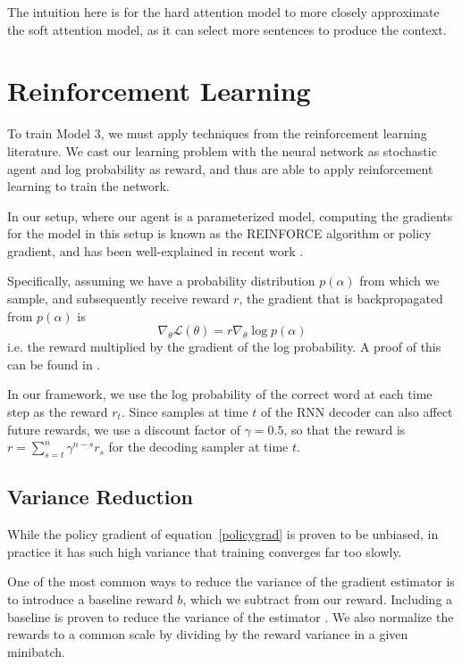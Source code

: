 \documentclass[11pt]{article}
\begin{document}
The intuition here is for the hard attention model to more closely approximate the soft attention model, as it can select more sentences to produce the context.

\section{Reinforcement Learning}

To train Model 3, we must apply techniques from the reinforcement learning literature. We cast our learning problem with the neural network as stochastic agent and log probability as reward, and thus are able to apply reinforcement learning to train the network.

In our setup, where our agent is a parameterized model, computing the gradients for the model in this setup is known as the REINFORCE algorithm \citep{williams1992reinforce} or policy gradient, and has been well-explained in recent work \citep{mnih2014visualattention, ba2015visualattention, schulman2015backprop}.

Specifically, assuming we have a probability distribution $p(\alpha)$ from which we sample, and subsequently receive reward $r$, the gradient that is backpropagated from $p(\alpha)$ is
\begin{equation}
\label{policygrad}
\nabla_\theta \mathcal{L}(\theta) = r \nabla_\theta \log p(\alpha)
\end{equation}
i.e. the reward multiplied by the gradient of the log probability. A proof of this can be found in \cite{williams1992reinforce}.

In our framework, we use the log probability of the correct word at each time step as the reward $r_t$. Since samples at time $t$ of the RNN decoder can also affect future rewards, we use a discount factor of $\gamma = 0.5$, so that the reward is $r = \sum_{s = t}^n \gamma^{n-s}r_s$ for the decoding sampler at time $t$.

\subsection{Variance Reduction}

While the policy gradient of equation~\ref{policygrad} is proven to be unbiased, in practice it has such high variance that training converges far too slowly.

One of the most common ways to reduce the variance of the gradient estimator is to introduce a baseline reward $b$, which we subtract from our reward. Including a baseline is proven to reduce the variance of the estimator \citep{mnih2014belief}. We also normalize the rewards to a common scale by dividing by the reward variance in a given minibatch.
\end{document}
